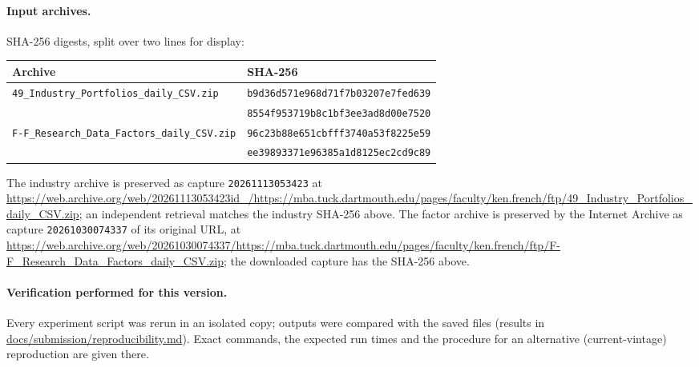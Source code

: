 \documentclass[11pt,a4paper]{article}
\theoremstyle{remark}
\begin{document}
\paragraph{Input archives.} SHA-256 digests, split over two lines for display:
\begin{center}\footnotesize
\begin{tabular}{@{}ll@{}}
\toprule
Archive & SHA-256 \\
\midrule
\texttt{49\_Industry\_Portfolios\_daily\_CSV.zip} & \texttt{b9d36d571e968d71f7b03207e7fed639} \\
 & \texttt{8554f953719b8c1bf3ee3ad8d00e7520} \\
\texttt{F-F\_Research\_Data\_Factors\_daily\_CSV.zip} & \texttt{96c23b88e651cbfff3740a53f8225e59} \\
 & \texttt{ee39893371e96385a1d8125ec2cd9c89} \\
\bottomrule
\end{tabular}
\end{center}
The industry archive is preserved as capture \texttt{20261113053423} at \url{https://web.archive.org/web/20261113053423id_/https://mba.tuck.dartmouth.edu/pages/faculty/ken.french/ftp/49_Industry_Portfolios_daily_CSV.zip}; an independent retrieval matches the industry SHA-256 above. The factor archive is preserved by the Internet Archive as capture \texttt{20261030074337} of its original URL, at \url{https://web.archive.org/web/20261030074337/https://mba.tuck.dartmouth.edu/pages/faculty/ken.french/ftp/F-F_Research_Data_Factors_daily_CSV.zip}; the downloaded capture has the SHA-256 above.

\paragraph{Verification performed for this version.} Every experiment script was rerun in an isolated copy; outputs were compared with the saved files (results in \url{docs/submission/reproducibility.md}). Exact commands, the expected run times and the procedure for an alternative (current-vintage) reproduction are given there.
\end{document}

